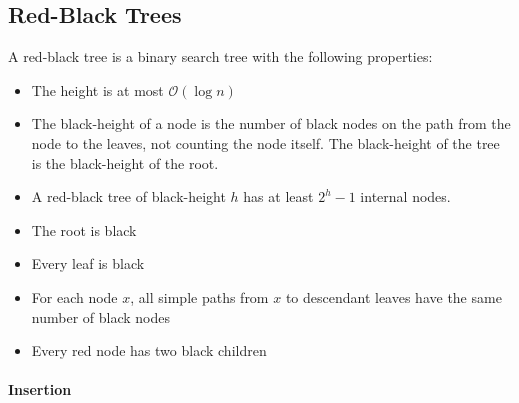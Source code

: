 \subsection{Red-Black Trees}
A red-black tree is a binary search tree with the following properties:
\begin{itemize}
    \item The height is at most \( \mathcal{O}(\log n) \)
    \item The black-height of a node is the number of black nodes on the path from the node to the leaves, not counting the node itself. The black-height of the tree is the black-height of the root.
    \item A red-black tree of black-height \( h \) has at least \( 2^h - 1 \) internal nodes. 
    \item The root is black
    \item Every leaf is black
    \item For each node \( x \), all simple paths from \( x \) to descendant leaves have the same number of black nodes
    \item Every red node has two black children
\end{itemize}

\paragraph{Insertion}

